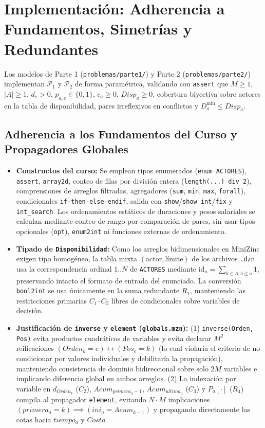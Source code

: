 \section{Implementación: Adherencia a Fundamentos, Simetrías y Redundantes}
\label{sec:implementacion}

Los modelos de Parte 1 (\nolinkurl{problemas/parte1/}) y Parte 2 (\nolinkurl{problemas/parte2/}) implementan $\mathcal{P}_1$ y $\mathcal{P}_2$ de forma paramétrica, validando con \texttt{assert} que $M \ge 1$, $|A| \ge 1$, $d_e > 0$, $p_{a,e} \in \{0,1\}$, $c_a \ge 0$, $Disp_a \ge 0$, cobertura biyectiva sobre actores en la tabla de disponibilidad, pares irreflexivos en conflictos y $D^{\min}_a \le Disp_a$.

\subsection{Adherencia a los Fundamentos del Curso y Propagadores Globales}
\label{subsec:adherencia_fundamentos}

\begin{itemize}
    \item \textbf{Constructos del curso:} Se emplean tipos enumerados (\texttt{enum ACTORES}), \texttt{assert}, \texttt{array2d}, conteo de filas por división entera (\texttt{length(...) div 2}), comprensiones de arreglos filtradas, agregadores (\texttt{sum}, \texttt{min}, \texttt{max}, \texttt{forall}), condicionales \texttt{if-then-else-endif}, salida con \texttt{show}/\texttt{show\_int}/\texttt{fix} y \texttt{int\_search}. Los ordenamientos estáticos de duraciones y pesos salariales se calculan mediante conteo de rango por comparación de pares, sin usar tipos opcionales (\texttt{opt}), \texttt{enum2int} ni funciones externas de ordenamiento.
    \item \textbf{Tipado de \texttt{Disponibilidad}:} Como los arreglos bidimensionales en MiniZinc exigen tipo homogéneo, la tabla mixta $(\text{actor}, \text{límite})$ de los archivos \texttt{.dzn} usa la correspondencia ordinal $1..N$ de \texttt{ACTORES} mediante $\text{id}_a = \sum_{b \in A : b \le a} 1$, preservando intacto el formato de entrada del enunciado. La conversión \texttt{bool2int} se usa únicamente en la suma redundante $R_1$, manteniendo las restricciones primarias $C_1$--$C_5$ libres de condicionales sobre variables de decisión.
    \item \textbf{Justificación de \texttt{inverse} y \texttt{element} (\texttt{globals.mzn}):} (1) \texttt{inverse(Orden, Pos)} evita productos cuadráticos de variables y evita declarar $M^2$ reificaciones $(Orden_k = e) \leftrightarrow (Pos_e = k)$ (lo cual violaría el criterio de no condicionar por valores individuales y debilitaría la propagación), manteniendo consistencia de dominio bidireccional sobre solo $2M$ variables e implicando diferencia global en ambos arreglos. (2) La indexación por variable en $d_{Orden_k}$ ($C_2$), $Acum_{primera_a - 1}$, $Acum_{ultima_a}$ ($C_3$) y $P_{\bar{a}}[\cdot]$ ($R_4$) compila al propagador \texttt{element}, evitando $N \cdot M$ implicaciones $(primera_a = k) \implies (ini_a = Acum_{k-1})$ y propagando directamente las cotas hacia $tiempo_a$ y $Costo$.
\end{itemize}

